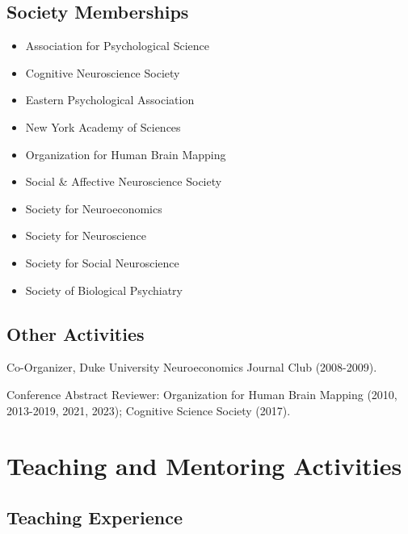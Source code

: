 \documentclass[11pt, letterpaper]{article}
\begin{document}
\pagebreak

\subsection*{Society Memberships}
\begin{multicols}{2}
\begin{itemize}[noitemsep]
\item Association for Psychological Science
\item Cognitive Neuroscience Society
\item Eastern Psychological Association
\item New York Academy of Sciences
\item Organization for Human Brain Mapping
\item Social \& Affective Neuroscience Society
\item Society for Neuroeconomics
\item Society for Neuroscience
\item Society for Social Neuroscience
\item Society of Biological Psychiatry
\end{itemize}
\end{multicols}

\subsection*{Other Activities}
\begin{hangparas}{.5in}{1}
Co-Organizer, Duke University Neuroeconomics Journal Club (2008-2009).

Conference Abstract Reviewer: Organization for Human Brain Mapping (2010, 2013-2019, 2021, 2023); Cognitive Science Society (2017). \\

\end{hangparas}


\section*{Teaching and Mentoring Activities}
\subsection*{Teaching Experience}
\end{document}

